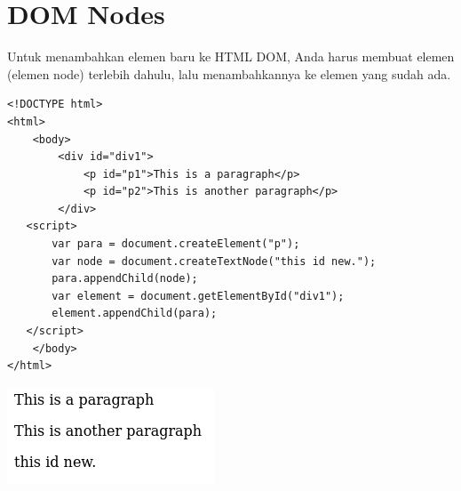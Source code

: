 \documentclass[a4paper,12pt]{article}
\begin{document}
\section*{DOM Nodes}
Untuk menambahkan elemen baru ke HTML DOM, Anda harus membuat elemen (elemen node) terlebih dahulu, lalu menambahkannya ke elemen yang sudah ada.
\begin{lstlisting}
<!DOCTYPE html>
<html>
    <body>
        <div id="div1">
            <p id="p1">This is a paragraph</p>
            <p id="p2">This is another paragraph</p>
        </div>
   <script>
       var para = document.createElement("p");
       var node = document.createTextNode("this id new.");
       para.appendChild(node);
       var element = document.getElementById("div1");
       element.appendChild(para);
   </script>
    </body>
</html>
\end{lstlisting}
\begin{center}
    \includegraphics[scale=.7]{8.png} 
\end{center}
\end{document}
